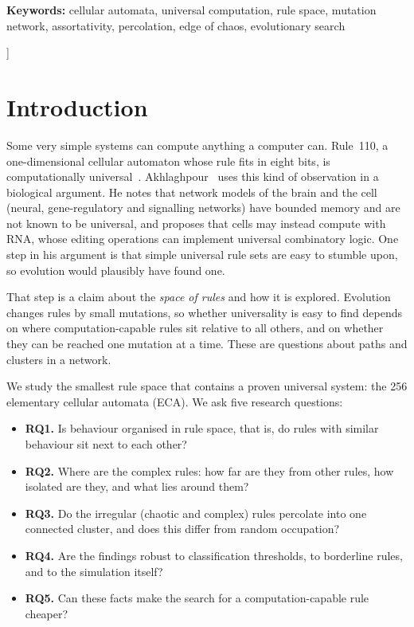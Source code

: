 \documentclass[10pt,letterpaper,twocolumn]{article}
\begin{document}
{\begin{center}
\begin{minipage}{0.92\textwidth}
\textbf{Keywords:} cellular automata, universal computation, rule space, mutation network, assortativity, percolation, edge of chaos, evolutionary search
\end{minipage}
\vspace{14pt}
\end{center}
}]

\section{Introduction}

Some very simple systems can compute anything a computer can. Rule~110, a one-dimensional cellular automaton whose rule fits in eight bits, is computationally universal~\cite{cook2004}. Akhlaghpour~\cite{akhlaghpour2022} uses this kind of observation in a biological argument. He notes that network models of the brain and the cell (neural, gene-regulatory and signalling networks) have bounded memory and are not known to be universal, and proposes that cells may instead compute with RNA, whose editing operations can implement universal combinatory logic. One step in his argument is that simple universal rule sets are easy to stumble upon, so evolution would plausibly have found one.

That step is a claim about the \emph{space of rules} and how it is explored. Evolution changes rules by small mutations, so whether universality is easy to find depends on where computation-capable rules sit relative to all others, and on whether they can be reached one mutation at a time. These are questions about paths and clusters in a network.

We study the smallest rule space that contains a proven universal system: the 256 elementary cellular automata (ECA). We ask five research questions:
\begin{itemize}
\item \textbf{RQ1.} Is behaviour organised in rule space, that is, do rules with similar behaviour sit next to each other?
\item \textbf{RQ2.} Where are the complex rules: how far are they from other rules, how isolated are they, and what lies around them?
\item \textbf{RQ3.} Do the irregular (chaotic and complex) rules percolate into one connected cluster, and does this differ from random occupation?
\item \textbf{RQ4.} Are the findings robust to classification thresholds, to borderline rules, and to the simulation itself?
\item \textbf{RQ5.} Can these facts make the search for a computation-capable rule cheaper?
\end{itemize}
\end{document}
